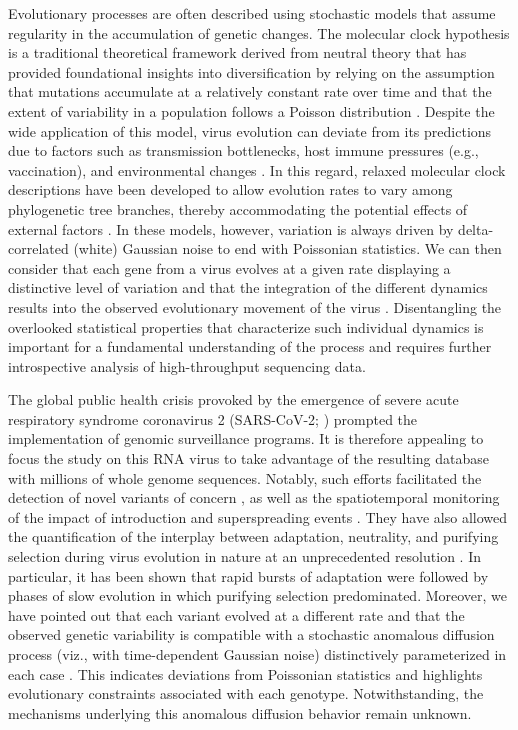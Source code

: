 Evolutionary processes are often described using stochastic models that assume regularity in the accumulation of genetic changes. The molecular clock hypothesis is a traditional theoretical framework derived from neutral theory that has provided foundational insights into diversification by relying on the assumption that mutations accumulate at a relatively constant rate over time and that the extent of variability in a population follows a Poisson distribution \cite{kimura1987molecular,kumar2005molecular}. Despite the wide application of this model, virus evolution can deviate from its predictions due to factors such as transmission bottlenecks, host immune pressures (e.g., vaccination), and environmental changes \cite{jenkins2002rates}. In this regard, relaxed molecular clock descriptions have been developed to allow evolution rates to vary among phylogenetic tree branches, thereby accommodating the potential effects of external factors \cite{drummond2006relaxed}. In these models, however, variation is always driven by delta-correlated (white) Gaussian noise to end with Poissonian statistics. We can then consider that each gene from a virus evolves at a given rate displaying a distinctive level of variation and that the integration of the different dynamics results into the observed evolutionary movement of the virus \cite{neher2022contributions}. Disentangling the overlooked statistical properties that characterize such individual dynamics is important for a fundamental understanding of the process and requires further introspective analysis of high-throughput sequencing data. 

The global public health crisis provoked by the emergence of severe acute respiratory syndrome coronavirus 2 (SARS-CoV-2; \cite{wu2020new}) prompted the implementation of genomic surveillance programs. It is therefore appealing to focus the study on this RNA virus to take advantage of the resulting database with millions of whole genome sequences. Notably, such efforts facilitated the detection of novel variants of concern \cite{viana2022rapid}, as well as the spatiotemporal monitoring of the impact of introduction and superspreading events \cite{kraemer2021spatiotemporal,lemieux2021phylogenetic}. They have also allowed the quantification of the interplay between adaptation, neutrality, and purifying selection during virus evolution in nature at an unprecedented resolution \cite{neher2022contributions,markov2023evolution}. In particular, it has been shown that rapid bursts of adaptation were followed by phases of slow evolution in which purifying selection predominated. Moreover, we have pointed out that each variant evolved at a different rate and that the observed genetic variability is compatible with a stochastic anomalous diffusion process (viz., with time-dependent Gaussian noise) distinctively parameterized in each case \cite{goiriz2023variant}. This indicates deviations from Poissonian statistics and highlights evolutionary constraints associated with each genotype. Notwithstanding, the mechanisms underlying this anomalous diffusion behavior remain unknown. 

